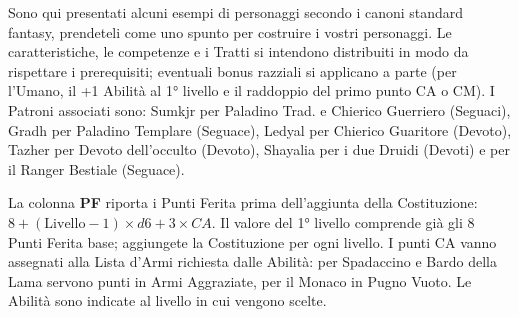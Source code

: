 Sono qui presentati alcuni esempi di personaggi secondo i canoni standard fantasy, prendeteli come uno spunto per costruire i vostri personaggi. Le caratteristiche, le competenze e i Tratti si intendono distribuiti in modo da rispettare i prerequisiti; eventuali bonus razziali si applicano a parte (per l'Umano, il +1 Abilità al 1° livello e il raddoppio del primo punto CA o CM). I Patroni associati sono: Sumkjr per Paladino Trad. e Chierico Guerriero (Seguaci), Gradh per Paladino Templare (Seguace), Ledyal per Chierico Guaritore (Devoto), Tazher per Devoto dell'occulto (Devoto), Shayalia per i due Druidi (Devoti) e per il Ranger Bestiale (Seguace).

La colonna \textbf{PF} riporta i Punti Ferita prima dell'aggiunta della Costituzione: $8 + (\text{Livello}-1)\times d6 + 3\times CA$. Il valore del 1° livello comprende già gli 8 Punti Ferita base; aggiungete la Costituzione per ogni livello. I punti CA vanno assegnati alla Lista d'Armi richiesta dalle Abilità: per Spadaccino e Bardo della Lama servono punti in Armi Aggraziate, per il Monaco in Pugno Vuoto. Le Abilità sono indicate al livello in cui vengono scelte.

